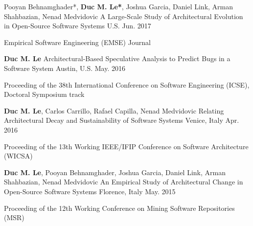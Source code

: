 \vspace{-1mm}

\begin{cventries}


  \cventry
    {Pooyan Behnamghader*, \textbf{Duc M. Le*}, Joshua Garcia, Daniel	Link, Arman	Shahbazian, Nenad Medvidovic} %
    {A Large-Scale Study of Architectural Evolution in Open-Source Software Systems} %
    {U.S. } %
    {Jun. 2017} %
    {
      \begin{cvitems} %
        \item Empirical Software Engineering (EMSE) Journal 
      \end{cvitems}
    }
    

\cventry
{\textbf{Duc M. Le}} %
{Architectural-Based Speculative Analysis to Predict Bugs in a Software System} %
{Austin, U.S.} %
{May. 2016} %
{
	\begin{cvitems} %
		\item Proceeding of the 38th International Conference on Software Engineering (ICSE), Doctoral Symposium track
	\end{cvitems}
}
	
\cventry
{\textbf{Duc M. Le}, Carlos Carrillo, Rafael Capilla, Nenad Medvidovic} %
{Relating Architectural Decay and Sustainability of Software Systems} %
{Venice, Italy} %
{Apr. 2016} %
{
	\begin{cvitems} %
		\item Proceeding of the 13th Working IEEE/IFIP Conference on Software Architecture (WICSA)
	\end{cvitems}
}


\cventry
{\textbf{Duc M. Le}, Pooyan Behnamghader, Joshua Garcia, Daniel	Link, Arman	Shahbazian, Nenad Medvidovic} %
{An Empirical Study of Architectural Change in Open-Source Software Systems} %
{Florence, Italy} %
{May. 2015} %
{
	\begin{cvitems} %
		\item Proceeding of the 12th Working Conference on Mining Software Repositories (MSR)
	\end{cvitems}
}


\end{cventries}
